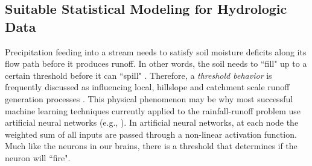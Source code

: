 %
%

\subsection{Suitable Statistical Modeling for Hydrologic Data}

Precipitation feeding into a stream needs to satisfy soil moisture deficits along its flow path before it produces runoff. In other words, the soil needs to ``fill" up to a certain threshold before it can ``spill" \cite{spence2006hydrology}. Therefore, a \textit{threshold behavior} is frequently discussed as influencing local, hillslope and catchment scale runoff generation processes \cite{zehe2008threshold}. This physical phenomenon may be why most successful machine learning techniques currently applied to the rainfall-runoff problem use artificial neural networks (e.g., ). In artificial neural networks, at each node the weighted sum of all inputs are passed through a non-linear activation function. Much like the neurons in our brains, there is a threshold that determines if the neuron will ``fire". 

